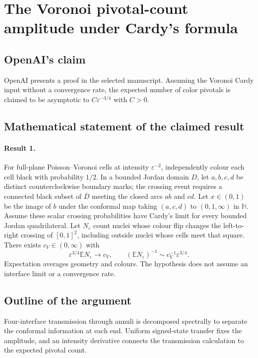 \documentclass[11pt]{article}
\begin{document}
\section*{The Voronoi pivotal-count amplitude under Cardy’s formula}

\subsection{OpenAI's claim}
OpenAI presents a proof in the selected manuscript. Assuming the Voronoi Cardy input without a convergence rate, the expected number of color pivotals is claimed to be asymptotic to $C\varepsilon^{-3/4}$ with $C>0$.

\subsection{Mathematical statement of the claimed result}
\paragraph{Result 1.} For full-plane Poisson--Voronoi cells at intensity $\varepsilon^{-2}$, independently colour each cell black with probability $1/2$. In a bounded Jordan domain $D$, let $a,b,c,d$ be distinct counterclockwise boundary marks; the crossing event requires a connected black subset of $\overline D$ meeting the closed arcs $ab$ and $cd$. Let $x\in(0,1)$ be the image of $b$ under the conformal map taking $(a,c,d)$ to $(0,1,\infty)$ in $\mathbb H$. Assume these scalar crossing probabilities have Cardy's limit for every bounded Jordan quadrilateral. Let $N_\varepsilon$ count nuclei whose colour flip changes the left-to-right crossing of $[0,1]^2$, including outside nuclei whose cells meet that square. There exists $c_V\in(0,\infty)$ with
\[
 \varepsilon^{3/4}\mathbb EN_\varepsilon\longrightarrow c_V,\qquad
 (\mathbb EN_\varepsilon)^{-1}\sim c_V^{-1}\varepsilon^{3/4}.
\]
Expectation averages geometry and colours. The hypothesis does not assume an interface limit or a convergence rate.

\subsection{Outline of the argument}
Four-interface transmission through annuli is decomposed spectrally to separate the conformal information at each end. Uniform signed-state transfer fixes the amplitude, and an intensity derivative connects the transmission calculation to the expected pivotal count.
\end{document}
